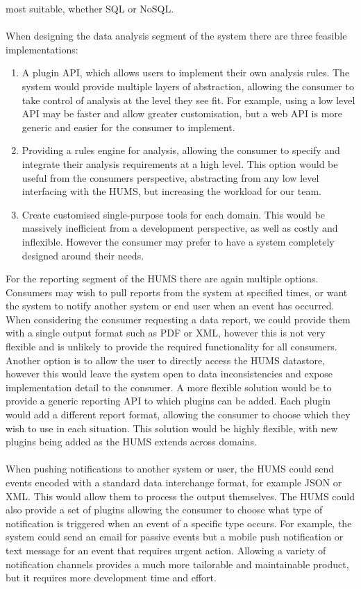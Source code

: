 \documentclass[10pt,a4paper]{article}
\begin{document}
most suitable, whether SQL or NoSQL.
\\ \\
When designing the data analysis segment of the system there are three feasible
implementations:
\begin{enumerate}
\item A plugin API, which allows users to implement their own analysis rules.
The system would provide multiple layers of abstraction, allowing the consumer
to take control of analysis at the level they see fit. For example, using a low
level API may be faster and allow greater customisation, but a web API is more
generic and easier for the consumer to implement.
\item Providing a rules engine for analysis, allowing the consumer to specify
and integrate their analysis requirements at a high level. This option would be
useful from the consumers perspective, abstracting from any low level
interfacing with the HUMS, but increasing the workload for our team.
\item Create customised single-purpose tools for each domain. This would be
massively inefficient from a development perspective, as well as costly and
inflexible. However the consumer may prefer to have a system completely designed
around their needs. \\
\end{enumerate}
For the reporting segment of the HUMS there are again multiple options.
Consumers may wish to pull reports from the system at specified times, or want
the system to notify another system or end user when an event has occurred. When
considering the consumer requesting a data report, we could provide them with a
single output format such as PDF or XML, however this is not very flexible and
is unlikely to provide the required functionality for all consumers. Another
option is to allow the user to directly access the HUMS datastore, however this
would leave the system open to data inconsistencies and expose implementation
detail to the consumer. A more flexible solution would be to provide a generic
reporting API to which plugins can be added. Each plugin would add a different
report format, allowing the consumer to choose which they wish to use in each
situation. This solution would be highly flexible, with new plugins being added
as the HUMS extends across domains.
\\ \\
When pushing notifications to another system or user, the HUMS could send events
encoded with a standard data interchange format, for example JSON or XML. This
would allow them to process the output themselves. The HUMS could also provide a
set of plugins allowing the consumer to choose what type of notification is
triggered when an event of a specific type occurs. For example, the system could
send an email for passive events but a mobile push notification or text message
for an event that requires urgent action. Allowing a variety of notification
channels provides a much more tailorable and maintainable product, but it
requires more development time and effort.
\end{document}
